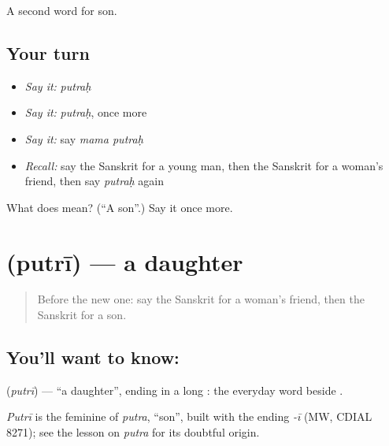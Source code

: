 \begin{grammarlens}[title={What you've built}]
A second word for son.
\end{grammarlens}

\subsection*{Your turn}
\begin{itemize}
\raggedright
  \item \emph{Say it:} \emph{putraḥ}
  \item \emph{Say it:} \emph{putraḥ}, once more
  \item \emph{Say it:} say \emph{mama putraḥ}
  \item \emph{Recall:} say the Sanskrit for a young man, then the Sanskrit for a woman's friend, then say \emph{putraḥ} again
\end{itemize}

\begin{tcolorbox}[breakable,colback=teal!4,colframe=teal!35!black,title={Before you move on}]
What does  mean? (\textquotedblleft{}A son\textquotedblright{}.) Say it once more.
\end{tcolorbox}
\section[\texorpdfstring{\sk{पुत्री} (putrī)}{पुत्री (putrī)}]{ (putrī) — a daughter}

\label{lesson:SA-C88-daughter}



\begin{quote}
Before the new one: say the Sanskrit for a woman's friend, then the Sanskrit for a son.
\end{quote}

\subsection*{You'll want to know: }
\textbf{} (\emph{putrī}) — \textquotedblleft{}a daughter\textquotedblright{}, \textbf{} ending in a long \textbf{}: the everyday word beside \textbf{}.

\begin{cousinweb}
\emph{Putrī} is the feminine of \emph{putra}, \textquotedblleft{}son\textquotedblright{}, built with the ending \emph{-ī} (MW, CDIAL 8271); see the lesson on \emph{putra} for its doubtful origin.
\end{cousinweb}

